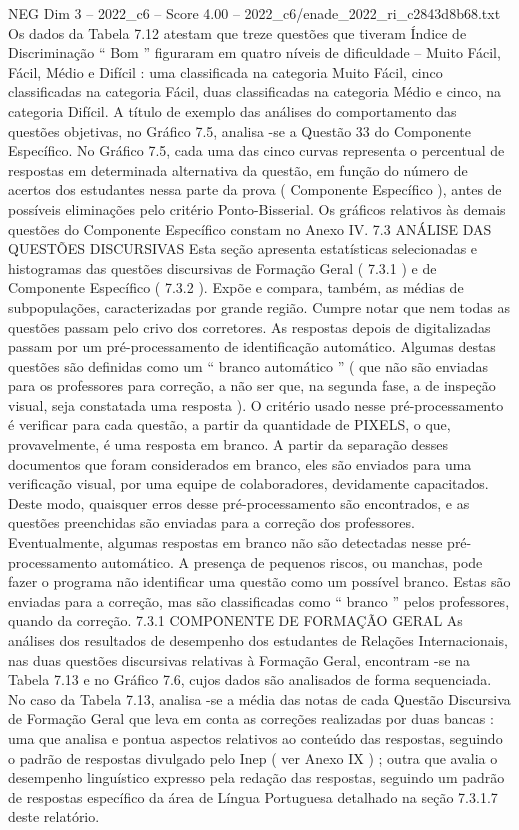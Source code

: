 \begin{textsample}{NEG Dim 3 – 2022\_c6 – Score 4.00 – 2022\_c6/enade\_2022\_ri\_c2843d8b68.txt}
Os dados da Tabela 7.12 atestam que treze questões que tiveram Índice de Discriminação “ Bom ” figuraram em quatro níveis de dificuldade – Muito Fácil, Fácil, Médio e Difícil : uma classificada na categoria Muito Fácil, cinco classificadas na categoria Fácil, duas classificadas na categoria Médio e cinco, na categoria Difícil.
A título de exemplo das análises do comportamento das questões objetivas, no Gráfico 7.5, analisa -se a Questão 33 do Componente Específico.
No Gráfico 7.5, cada uma das cinco curvas representa o percentual de respostas em determinada alternativa da questão, em função do número de acertos dos estudantes nessa parte da prova ( Componente Específico ), antes de possíveis eliminações pelo critério Ponto-Bisserial.
Os gráficos relativos às demais questões do Componente Específico constam no Anexo IV. 7.3 ANÁLISE DAS QUESTÕES DISCURSIVAS Esta seção apresenta estatísticas selecionadas e histogramas das questões discursivas de Formação Geral ( 7.3.1 ) e de Componente Específico ( 7.3.2 ).
Expõe e compara, também, as médias de subpopulações, caracterizadas por grande região.
Cumpre notar que nem todas as questões passam pelo crivo dos corretores.
As respostas depois de digitalizadas passam por um pré-processamento de identificação automático.
Algumas destas questões são definidas como um “ branco automático ” ( que não são enviadas para os professores para correção, a não ser que, na segunda fase, a de inspeção visual, seja constatada uma resposta ).
O critério usado nesse pré-processamento é verificar para cada questão, a partir da quantidade de PIXELS, o que, provavelmente, é uma resposta em branco.
A partir da separação desses documentos que foram considerados em branco, eles são enviados para uma verificação visual, por uma equipe de colaboradores, devidamente capacitados.
Deste modo, quaisquer erros desse pré-processamento são encontrados, e as questões preenchidas são enviadas para a correção dos professores.
Eventualmente, algumas respostas em branco não são detectadas nesse pré-processamento automático.
A presença de pequenos riscos, ou manchas, pode fazer o programa não identificar uma questão como um possível branco.
Estas são enviadas para a correção, mas são classificadas como “ branco ” pelos professores, quando da correção. 7.3.1 COMPONENTE DE FORMAÇÃO GERAL As análises dos resultados de desempenho dos estudantes de Relações Internacionais, nas duas questões discursivas relativas à Formação Geral, encontram -se na Tabela 7.13 e no Gráfico 7.6, cujos dados são analisados de forma sequenciada.
No caso da Tabela 7.13, analisa -se a média das notas de cada Questão Discursiva de Formação Geral que leva em conta as correções realizadas por duas bancas : uma que analisa e pontua aspectos relativos ao conteúdo das respostas, seguindo o padrão de respostas divulgado pelo Inep ( ver Anexo IX ) ; outra que avalia o desempenho linguístico expresso pela redação das respostas, seguindo um padrão de respostas específico da área de Língua Portuguesa detalhado na seção 7.3.1.7 deste relatório.

\end{textsample}
